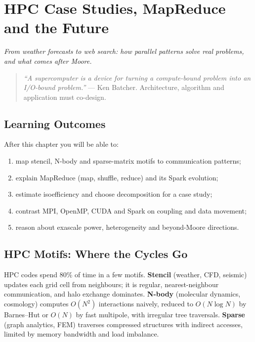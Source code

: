 \chapter{HPC Case Studies, MapReduce and the Future}\label{ch:applications}
\begin{center}\small\textit{From weather forecasts to web search: how parallel patterns solve real problems, and what comes after Moore.}\end{center}

\begin{quote}
\emph{``A supercomputer is a device for turning a compute-bound problem into an I/O-bound problem.''} --- Ken Batcher. Architecture, algorithm and application must co-design.
\end{quote}

\noindent{}
\vspace{0.4em}

\section*{Learning Outcomes}
After this chapter you will be able to:
\begin{enumerate}[label=(L\arabic*)]
    \item map stencil, N-body and sparse-matrix motifs to communication patterns;
    \item explain MapReduce (map, shuffle, reduce) and its Spark evolution;
    \item estimate isoefficiency and choose decomposition for a case study;
    \item contrast MPI, OpenMP, CUDA and Spark on coupling and data movement;
    \item reason about exascale power, heterogeneity and beyond-Moore directions.
\end{enumerate}

\section{HPC Motifs: Where the Cycles Go}\label{sec:hpc}
HPC codes spend 80\% of time in a few motifs. \textbf{Stencil} (weather, CFD, seismic) updates each grid cell from neighbours; it is regular, nearest-neighbour communication, and halo exchange dominates. \textbf{N-body} (molecular dynamics, cosmology) computes $O(N^2)$ interactions naively, reduced to $O(N\log N)$ by Barnes--Hut or $O(N)$ by fast multipole, with irregular tree traversals. \textbf{Sparse} (graph analytics, FEM) traverses compressed structures with indirect accesses, limited by memory bandwidth and load imbalance.

